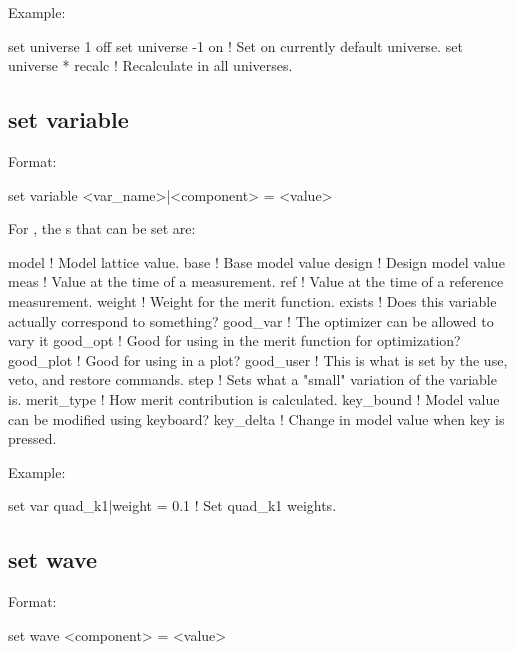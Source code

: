 {{{{{{{Example:
\begin{example}
  set universe 1 off
  set universe -1 on    ! Set on currently default universe.
  set universe * recalc ! Recalculate in all universes.
\end{example}


\subsection{set variable}
\label{s:set.variable}

Format:
\begin{example}
  set variable <var_name>|<component> = <value>
\end{example}

For , the s that can be set are:
\begin{example}
  model       ! Model lattice value.
  base        ! Base model value
  design      ! Design model value
  meas        ! Value at the time of a measurement.
  ref         ! Value at the time of a reference measurement.
  weight      ! Weight for the merit function.
  exists      ! Does this variable actually correspond to something?
  good_var    ! The optimizer can be allowed to vary it
  good_opt    ! Good for using in the merit function for optimization?
  good_plot   ! Good for using in a plot?
  good_user   ! This is what is set by the use, veto, and restore commands.
  step        ! Sets what a "small" variation of the variable is.
  merit_type  ! How merit contribution is calculated.
  key_bound   ! Model value can be modified using keyboard?
  key_delta   ! Change in model value when key is pressed.
\end{example}

Example:
\begin{example}
  set var quad_k1|weight = 0.1         ! Set quad_k1 weights. 
\end{example}


\subsection{set wave}
\label{s:set.wave}

Format:
\begin{example}
  set wave <component> = <value>
\end{example}

}}}}}}}
